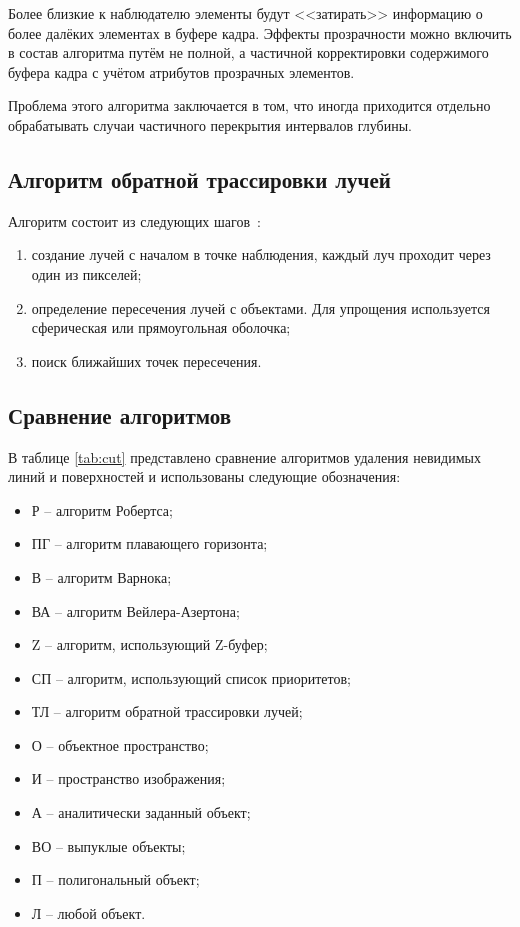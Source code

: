 Более близкие к наблюдателю элементы будут <<затирать>> информацию о более далёких элементах в буфере кадра. Эффекты прозрачности можно включить в состав алгоритма путём не полной, а частичной корректировки содержимого буфера кадра с учётом атрибутов прозрачных элементов.

Проблема этого алгоритма заключается в том, что иногда приходится отдельно обрабатывать случаи частичного перекрытия интервалов глубины.

\subsection{Алгоритм обратной трассировки лучей}

Алгоритм состоит из следующих шагов~\cite{golovnin}:

\begin{enumerate}[label=\arabic*.]
	\item создание лучей с началом в точке наблюдения, каждый луч проходит через один из пикселей;
	\item определение пересечения лучей с объектами. Для упрощения используется сферическая или прямоугольная оболочка;
	\item поиск ближайших точек пересечения. 
\end{enumerate}

\subsection{Сравнение алгоритмов}

В таблице \ref{tab:cut} представлено сравнение алгоритмов удаления невидимых линий и поверхностей и использованы следующие обозначения:

\begin{itemize}
	\item Р -- алгоритм Робертса;
	\item ПГ -- алгоритм плавающего горизонта;
	\item В -- алгоритм Варнока;
	\item ВА -- алгоритм Вейлера-Азертона;
	\item Z -- алгоритм, использующий Z-буфер;
	\item СП -- алгоритм, использующий список приоритетов;
	\item ТЛ -- алгоритм обратной трассировки лучей;
	\item О -- объектное пространство;
	\item И -- пространство изображения;
	\item А -- аналитически заданный объект;
	\item ВО -- выпуклые объекты;
	\item П -- полигональный объект;
	\item Л -- любой объект.
\end{itemize}

